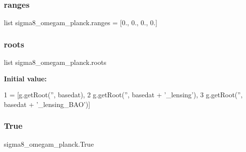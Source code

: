 \subsubsection{\texorpdfstring{ranges}{ranges}}
{\footnotesize\ttfamily list sigma8\+\_\+omegam\+\_\+planck.\+ranges = \mbox{[}0., 0., 0., 0.\mbox{]}}

\mbox{\label{namespacesigma8__omegam__planck_a3beb52e6133173b1edfa9b6f5d894623}} 
\subsubsection{\texorpdfstring{roots}{roots}}
{\footnotesize\ttfamily list sigma8\+\_\+omegam\+\_\+planck.\+roots}

{\bfseries Initial value\+:}
\begin{DoxyCode}
1 =  [g.getRoot(\textcolor{stringliteral}{''}, basedat),
2                  g.getRoot(\textcolor{stringliteral}{''}, basedat + \textcolor{stringliteral}{'\_lensing'}),
3                  g.getRoot(\textcolor{stringliteral}{''}, basedat + \textcolor{stringliteral}{'\_lensing\_BAO'})]
\end{DoxyCode}
\mbox{\label{namespacesigma8__omegam__planck_ad94cbe65927705f57828db3e54fa2b81}} 
\subsubsection{\texorpdfstring{True}{True}}
{\footnotesize\ttfamily sigma8\+\_\+omegam\+\_\+planck.\+True}

